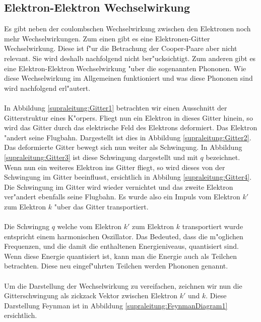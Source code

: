 \begin{refsection}
\section{Elektron-Elektron Wechselwirkung\label{supraleitung:elektronelektronwecheslwirkung}}
Es gibt neben der coulombschen Wechselwirkung zwischen den Elektronen noch mehr Wechselwirkungen. Zum einen gibt es eine Elektronen-Gitter Wechselwirkung. Diese ist f"ur die Betrachung der Cooper-Paare aber nicht relevant. Sie wird deshalb nachfolgend nicht ber"ucksichtigt. Zum anderen gibt es eine Elektron-Elektron Wechselwirkung "uber die sogenannten Phononen. Wie diese Wechselwirkung im Allgemeinen funktioniert und was diese Phononen sind wird nachfolgend erl"autert.
\\
\\
In Abbildung \ref{supraleitung:Gitter1} betrachten wir einen Ausschnitt der Gitterstruktur eines K"orpers. Fliegt nun ein Elektron in dieses Gitter hinein, so wird das Gitter durch das elektrische Feld des Elektrons deformiert. Das Elektron "andert seine Flugbahn. Dargestellt ist dies in Abbildung \ref{supraleitung:Gitter2}. Das deformierte Gitter bewegt sich nun weiter als Schwingung. In Abbildung \ref{supraleitung:Gitter3} ist diese Schwingung dargestellt und mit $q$ bezeichnet. Wenn nun ein weiteres Elektron ins Gitter fliegt, so wird dieses von der Schwingung im Gitter beeinflusst, ersichtlich in Abbilung \ref{supraleitung:Gitter4}. Die Schwingung im Gitter wird wieder vernichtet und das zweite Elektron ver"andert ebenfalls seine Flugbahn. Es wurde also ein Impuls vom Elektron $k'$ zum Elektron $k$ "uber das Gitter transportiert. 
\\
\\
Die Schwingng $q$ welche vom Elektron $k'$ zum Elektron $k$ transportiert wurde entspricht einem harmonischen Oszillator. Das Bedeuted, dass die m"oglichen Frequenzen, und die damit die enthaltenen Energieniveaus, quantisiert sind. Wenn diese Energie quantisiert ist, kann man die Energie auch als Teilchen betrachten. Diese neu eingef"uhrten Teilchen werden Phononen genannt.\\
\\
Um die Darstellung der Wechselwirkung zu vereifachen, zeichnen wir nun die Gitterschwingung als zickzack Vektor zwischen Elektron $k'$ und $k$. Diese Darstellung Feynman ist in Abbildung \ref{supraleitung:FeynmanDiagram1} ersichtlich.%

\end{refsection}
